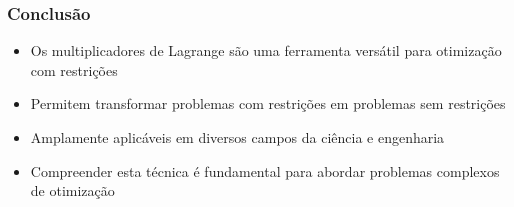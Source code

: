 \documentclass[11pt]{beamer}
\begin{document}
\begin{frame}
\frametitle{Conclusão}
\begin{itemize}
    \item Os multiplicadores de Lagrange são uma ferramenta versátil para otimização com restrições
    \item Permitem transformar problemas com restrições em problemas sem restrições
    \item Amplamente aplicáveis em diversos campos da ciência e engenharia
    \item Compreender esta técnica é fundamental para abordar problemas complexos de otimização
\end{itemize}
\end{frame}
\end{document}
